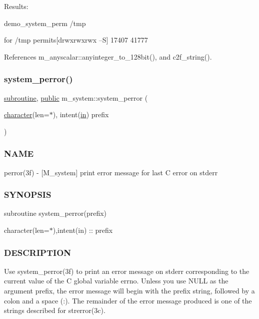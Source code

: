 Results\+:

demo\+\_\+system\+\_\+perm /tmp

for /tmp permits\mbox{[}drwxrwxrwx --S\mbox{]} 17407 41777 

References m\+\_\+anyscalar\+::anyinteger\+\_\+to\+\_\+128bit(), and c2f\+\_\+string().

\mbox{\label{namespacem__system_afae451a1fc5432274dc1f75a364051b4}} 
\subsubsection{\texorpdfstring{system\+\_\+perror()}{system\_perror()}}
{\footnotesize\ttfamily \hyperlink{M__stopwatch_83_8txt_acfbcff50169d691ff02d4a123ed70482}{subroutine}, \hyperlink{M__stopwatch_83_8txt_a2f74811300c361e53b430611a7d1769f}{public} m\+\_\+system\+::system\+\_\+perror (\begin{DoxyParamCaption}\item[{\hyperlink{option__stopwatch_83_8txt_abd4b21fbbd175834027b5224bfe97e66}{character}(len=$\ast$), intent(\hyperlink{M__journal_83_8txt_afce72651d1eed785a2132bee863b2f38}{in})}]{prefix }\end{DoxyParamCaption})}



\subsubsection*{N\+A\+ME}

perror(3f) -\/ \mbox{[}M\+\_\+system\mbox{]} print error message for last C error on stderr \subsubsection*{S\+Y\+N\+O\+P\+S\+IS}

subroutine system\+\_\+perror(prefix)

character(len=$\ast$),intent(in) \+:\+: prefix

\subsubsection*{D\+E\+S\+C\+R\+I\+P\+T\+I\+ON}

Use system\+\_\+perror(3f) to print an error message on stderr corresponding to the current value of the C global variable errno. Unless you use N\+U\+LL as the argument prefix, the error message will begin with the prefix string, followed by a colon and a space (\+:). The remainder of the error message produced is one of the strings described for strerror(3c).

